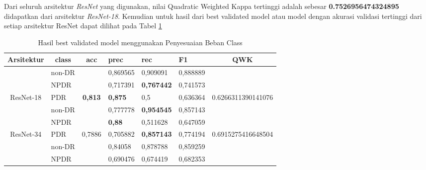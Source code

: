 Dari seluruh arsitektur \emph{ResNet} yang digunakan, nilai Quadratic Weighted Kappa tertinggi adalah sebesar \textbf{0.7526956474324895} didapatkan dari arsitektur \emph{ResNet-18}. Kemudian untuk hasil dari best validated model atau model dengan akurasi validasi tertinggi dari setiap arsitektur ResNet dapat dilihat pada Tabel \ref{tb:HasilValClassWeight}

\begin{table}[H]
	\begin{center}
		\caption{Hasil best validated model menggunakan Penyesuaian Beban Class}
		\label{tb:HasilValClassWeight}
		\begin{tabular}{|c|l|c|l|l|l|c|}
			\hline
			\rowcolor[HTML]{C0C0C0} 
			Arsitektur & \multicolumn{1}{c|}{\cellcolor[HTML]{C0C0C0}class} & acc                      & prec     & rec      & F1       & QWK                                  \\ \hline
			& non-DR                                             &                          & 0,869565 & 0,909091 & 0,888889 &                                      \\ \cline{2-2} \cline{4-6}
			& NPDR                                               &                          & 0,717391 & \textbf{0,767442} & 0,741573 &                             \\ \cline{2-2} \cline{4-6}
			\multirow{-3}{*}{ResNet-18}  & PDR                                                & \multirow{-3}{*}{\textbf{0,813}}  & \textbf{0,875}    & 0,5      & 0,636364 & \multirow{-3}{*}{0.6266311390141076} \\ \hline
			& non-DR                                             &                          & 0,777778 & \textbf{0,954545} & 0,857143 &                             \\ \cline{2-2} \cline{4-6}
			& NPDR                                               &                          & \textbf{0,88}     & 0,511628 & 0,647059 &                              \\ \cline{2-2} \cline{4-6}
			\multirow{-3}{*}{ResNet-34}  & PDR                                                & \multirow{-3}{*}{0,7886} & 0,705882 & \textbf{0,857143} & 0,774194 & \multirow{-3}{*}{0.6915275416648504} \\ \hline
			& non-DR                                             &                          & 0,84058  & 0,878788 & 0,859259 &                                      \\ \cline{2-2} \cline{4-6}
			& NPDR                                               &                          & 0,690476 & 0,674419 & 0,682353 &                                      \\ \cline{2-2} \cline{4-6}

\end{tabular}
\end{center}
\end{table}
